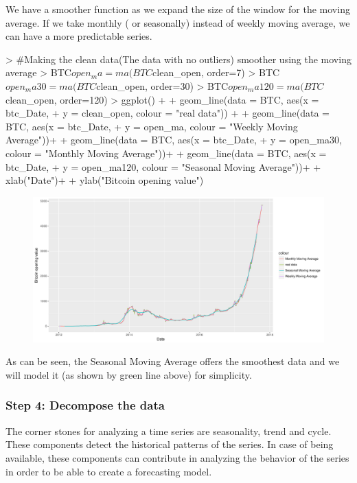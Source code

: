 \documentclass{article}
\begin{document}
We have a smoother function as we expand the size of the window for the moving average. If we take monthly ( or seasonally) instead of weekly moving average, we can have a more predictable series.
\begin{Schunk}
\begin{Sinput}
> #Making the clean data(The data with no outliers) smoother using the moving average
> BTC$open_ma = ma(BTC$clean_open, order=7) 
> BTC$open_ma30 = ma(BTC$clean_open, order=30)
> BTC$open_ma120 = ma(BTC$clean_open, order=120)
> ggplot() +
+   geom_line(data = BTC, aes(x = btc_Date, 
+                             y = clean_open, colour = "real data")) +
+   geom_line(data = BTC, aes(x = btc_Date, 
+                             y = open_ma,   colour = "Weekly Moving Average"))+
+   geom_line(data = BTC, aes(x = btc_Date, 
+                             y = open_ma30, colour = "Monthly Moving Average"))+
+   geom_line(data = BTC, aes(x = btc_Date, 
+                             y = open_ma120, colour = "Seasonal Moving Average"))+
+   xlab("Date")+
+   ylab("Bitcoin opening value")
\end{Sinput}
\end{Schunk}
\begin{figure}[H]
\begin{center}
\includegraphics[width=\textwidth,totalheight=0.6\textwidth]{Report-arima}
\end{center}
\label{arima}
\end{figure}
As can be seen, the Seasonal Moving Average offers the smoothest data and we will model it (as shown by green line above) for simplicity. 

\subsubsection*{Step 4: Decompose the data}

The corner stones for analyzing a time series are seasonality, trend and cycle. These components detect the historical patterns of the series. In case of being available, these components can contribute in analyzing the behavior of the series in order to be able to create a forecasting model.
\end{document}
